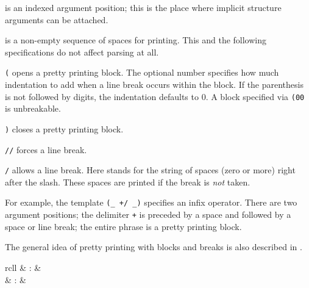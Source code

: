 \begin{isabellebody}
\begin{isamarkuptext}
\begin{description}
  \item \isa{{\isachardoublequote}{\isasymindex}{\isachardoublequote}} is an indexed argument position; this is the place
  where implicit structure arguments can be attached.

  \item {} is a non-empty sequence of spaces for printing.
  This and the following specifications do not affect parsing at all.

  \item \verb|(| opens a pretty printing block.  The
  optional number specifies how much indentation to add when a line
  break occurs within the block.  If the parenthesis is not followed
  by digits, the indentation defaults to 0.  A block specified via
  \verb|(00| is unbreakable.

  \item \verb|)| closes a pretty printing block.

  \item \verb|//| forces a line break.

  \item \verb|/| allows a line break.  Here 
  stands for the string of spaces (zero or more) right after the
  slash.  These spaces are printed if the break is \emph{not} taken.

  \end{description}

  For example, the template \verb|(_ +/ _)| specifies an infix
  operator.  There are two argument positions; the delimiter
  \verb|+| is preceded by a space and followed by a space or
  line break; the entire phrase is a pretty printing block.

  The general idea of pretty printing with blocks and breaks is also
  described in \cite{paulson-ml2}.%
\end{isamarkuptext}%
\isamarkuptrue%
%
\isamarkuptrue%
%
\begin{isamarkuptext}%
\begin{matharray}{rcll}
    \hypertarget{command.notation}{\hyperlink{command.notation}{\mbox{}}} & : &  \\
    \hypertarget{command.no-notation}{\hyperlink{command.no-notation}{\mbox{}}} & : &  \\
  \end{matharray}


\end{isamarkuptext}
\end{isabellebody}

